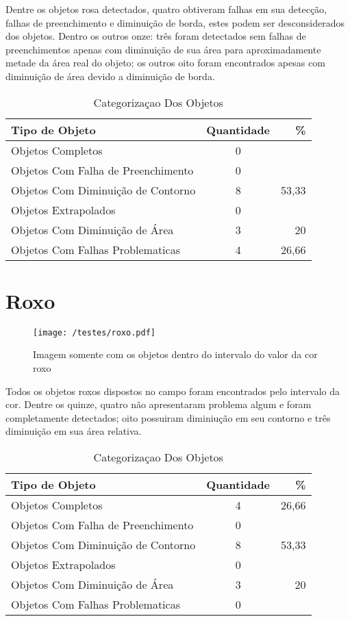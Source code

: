 Dentre os objetos rosa detectados, quatro obtiveram falhas em sua detecção, falhas de preenchimento e diminuição de borda, estes podem ser desconsiderados dos objetos. Dentro os outros onze: três foram detectados sem falhas de preenchimentos apenas com diminuição de sua área para aproximadamente metade da área real do objeto; os outros oito foram encontrados apesas com diminuição de área devido a diminuição de borda.
	
	\begin{table}[h]
\centering
\begin{tabular}{l|c|r}
Tipo de Objeto & Quantidade  & \% \\ %
\hline                               %
Objetos Completos &  0\\
\hline 
Objetos Com Falha de Preenchimento & 0\\
\hline 
Objetos Com Diminuição de Contorno & 8& 53,33
 \\
\hline 
Objetos Extrapolados & 0 \\
\hline 
Objetos Com Diminuição de Área & 3 & 20\\
\hline 
Objetos Com Falhas Problematicas & 4 & 26,66 \\
\hline 
\end{tabular}
\caption{Categorizaçao Dos Objetos}
\end{table}

\section{Roxo}
	\begin{figure}[H]
		\centering
		\texttt{[image: /testes/roxo.pdf]}
		\caption{Imagem somente com os objetos dentro do intervalo do valor da cor roxo}
		\label{disposicaoparte}
	\end{figure}

Todos os objetos roxos dispostos no campo foram encontrados pelo intervalo da cor. Dentre os quinze, quatro não apresentaram problema algum e foram completamente detectados; oito possuiram diminiução em seu contorno e três diminuição em sua área relativa.
\begin{table}[h]
\centering
\begin{tabular}{l|c|r}
Tipo de Objeto & Quantidade  & \% \\ %
\hline                               %
Objetos Completos &  4 & 26,66\\
\hline 
Objetos Com Falha de Preenchimento & 0 \\
\hline 
Objetos Com Diminuição de Contorno &  8 & 53,33\\
\hline 
Objetos Extrapolados & 0 \\
\hline 
Objetos Com Diminuição de Área & 3 & 20\\
\hline 
Objetos Com Falhas Problematicas & 0 \\
\hline 
\end{tabular}
\caption{Categorizaçao Dos Objetos}
\end{table}
	
